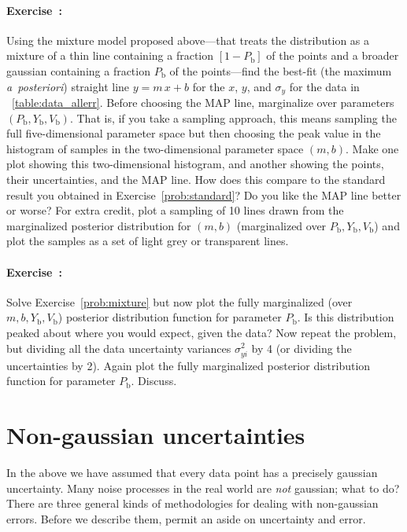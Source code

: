 \documentclass[12pt,twoside]{article}
\newcommand{\notenglish}[1]{\textsl{#1}}
\newcommand{\aposteriori}{\notenglish{a~posteriori}}
\newcommand{\problemname}{Exercise}
\newcounter{problem}
\newenvironment{problem}{\paragraph{\problemname~\theproblem:}\refstepcounter{problem}}{}
\newcommand{\Pbad}{P_{\mathrm{b}}}
\newcommand{\Ybad}{Y_{\mathrm{b}}}
\newcommand{\Vbad}{V_{\mathrm{b}}}
\begin{document}
\begin{problem}\label{prob:mixture}
Using the mixture model proposed above---that treats the distribution
as a mixture of a thin line containing a fraction $[1-\Pbad]$ of the
points and a broader gaussian containing a fraction $\Pbad$ of the
points---find the best-fit (the maximum \aposteriori) straight line
$y=m\,x+b$ for the $x$, $y$, and $\sigma_y$ for the data in
\tablename~\ref{table:data_allerr}.  Before choosing the MAP line,
marginalize over parameters $(\Pbad,\Ybad,\Vbad)$.  That is, if you
take a sampling approach, this means sampling the full
five-dimensional parameter space but then choosing the peak value in
the histogram of samples in the two-dimensional parameter space
$(m,b)$.  Make one plot showing this two-dimensional histogram, and
another showing the points, their uncertainties, and the MAP line.
How does this compare to the standard result you obtained in
\problemname~\ref{prob:standard}?  Do you like the MAP line better or
worse?  For extra credit, plot a sampling of 10 lines drawn from the
marginalized posterior distribution for $(m,b)$ (marginalized over
$\Pbad,\Ybad,\Vbad$) and plot the samples as a set of light grey or
transparent lines.
\end{problem}

\begin{problem}\label{prob:badfraction}
Solve \problemname~\ref{prob:mixture} but now plot the fully
marginalized (over $m,b,\Ybad,\Vbad$) posterior distribution function
for parameter $\Pbad$.  Is this distribution peaked about where you
would expect, given the data?  Now repeat the problem, but dividing
all the data uncertainty variances $\sigma_{yi}^2$ by 4 (or dividing
the uncertainties by 2).  Again plot the fully marginalized posterior
distribution function for parameter $\Pbad$.  Discuss.
\end{problem}



\section{Non-gaussian uncertainties}\label{sec:non-gaussian}

In the above we have assumed that every data point has a precisely
gaussian uncertainty.  Many noise processes in the real world are
\emph{not} gaussian; what to do?  There are three general kinds of
methodologies for dealing with non-gaussian errors.  Before we
describe them, permit an aside on uncertainty and error.
\end{document}
